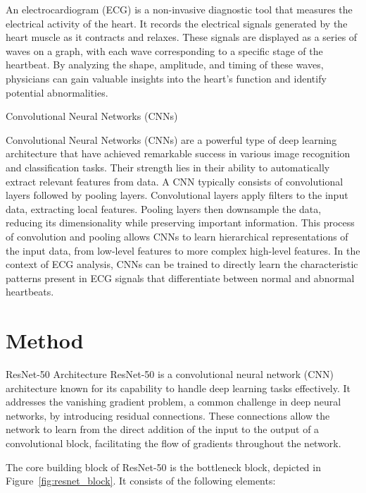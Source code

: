 \documentclass[conference]{IEEEtran}
\begin{document}
An electrocardiogram (ECG) is a non-invasive diagnostic tool that measures the electrical activity of the heart. It records the electrical signals generated by the heart muscle as it contracts and relaxes.  These signals are displayed as a series of waves on a graph, with each wave corresponding to a specific stage of the heartbeat.  By analyzing the shape, amplitude, and timing of these waves, physicians can gain valuable insights into the heart's function and identify potential abnormalities.

Convolutional Neural Networks (CNNs)

Convolutional Neural Networks (CNNs) are a powerful type of deep learning architecture that have achieved remarkable success in various image recognition and classification tasks. Their strength lies in their ability to automatically extract relevant features from data.  A CNN typically consists of convolutional layers followed by pooling layers. Convolutional layers apply filters to the input data, extracting local features. Pooling layers then downsample the data, reducing its dimensionality while preserving important information. This process of convolution and pooling allows CNNs to learn hierarchical representations of the input data, from low-level features to more complex high-level features.  In the context of ECG analysis, CNNs can be trained to directly learn the characteristic patterns present in ECG signals that differentiate between normal and abnormal heartbeats. 

\section{Method}

ResNet-50 Architecture
ResNet-50 is a convolutional neural network (CNN) architecture known for its capability to handle deep learning tasks effectively. It addresses the vanishing gradient problem, a common challenge in deep neural networks, by introducing residual connections. These connections allow the network to learn from the direct addition of the input to the output of a convolutional block, facilitating the flow of gradients throughout the network.

The core building block of ResNet-50 is the bottleneck block, depicted in Figure~\ref{fig:resnet_block}. It consists of the following elements:
\end{document}
